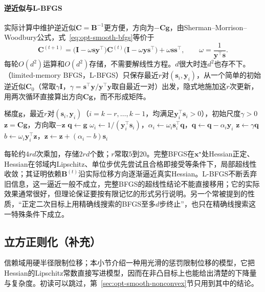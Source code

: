 \paragraph{逆近似与L-BFGS}
实际计算中维护逆近似$\bm C=\bm B^{-1}$更方便，方向为$-\bm C\bm g$，由Sherman--Morrison--Woodbury公式，式~\eqref{eq:opt-smooth-bfgs}等价于
\[
  \bm C^{(t+1)}=\bigl(\bm I-\omega\bm s\bm y^\top\bigr)\bm C^{(t)}\bigl(\bm I-\omega\bm y\bm s^\top\bigr)+\omega\bm s\bm s^\top,\qquad\omega=\frac1{\bm y^\top\bm s}.
\]
每轮$O(d^2)$运算和$O(d^2)$存储，不需要解线性方程。$d$很大时连$d^2$也存不下。（limited-memory BFGS，L-BFGS）只保存最近$r$对$(\bm s_i,\bm y_i)$，从一个简单的初始逆近似$\bm C_0$（常取$\gamma\bm I$，$\gamma=\bm s^\top\bm y/\bm y^\top\bm y$取自最近一对）出发，隐式地施加这$r$次更新，用两次循环直接算出方向$\bm C\bm g$，而不形成矩阵。

\begin{algorithm}[L-BFGS的双循环递推]
\label{alg:opt-smooth-lbfgs}
\begin{algorithmic}[1]
\Require 梯度$\bm g$，最近$r$对$(\bm s_i,\bm y_i)$（$i=k-r,\dots,k-1$，均满足$\bm y_i^\top\bm s_i>0$），初始尺度$\gamma>0$
\Ensure $\bm z=\bm C\bm g$，方向取$-\bm z$
\State $\bm q\gets\bm g$
 
  \State $\omega_i\gets1/(\bm y_i^\top\bm s_i)$，$\alpha_i\gets\omega_i\bm s_i^\top\bm q$，$\bm q\gets\bm q-\alpha_i\bm y_i$
\EndFor
\State $\bm z\gets\gamma\bm q$
 
  \State $b\gets\omega_i\bm y_i^\top\bm z$，$\bm z\gets\bm z+(\alpha_i-b)\bm s_i$
\EndFor
\end{algorithmic}
\end{algorithm}

每轮约$4rd$次乘加，存储$2rd$个数；$r$常取$5$到$20$。完整BFGS在$\bm x^\star$处Hessian正定、Hessian在邻域内Lipschitz、单位步优先尝试且合格即接受等条件下，局部超线性收敛；其证明依赖$\bm B^{(t)}$沿实际位移方向逐渐逼近真实Hessian\cite{math-nocedal2006numerical}。L-BFGS不断丢弃旧信息，这一逼近一般不成立，完整BFGS的超线性结论不能直接移用；它的实际效果通常很好，但理论保证要按有限记忆的形式另行说明。另一个常被提到的性质，“正定二次目标上用精确线搜索的BFGS至多$d$步终止”，也只在精确线搜索这一特殊条件下成立。

\subsection{立方正则化（补充）}
\label{sec:opt-smooth-cubic}

信赖域用硬半径限制位移；本小节介绍一种用光滑的惩罚限制位移的模型，它把Hessian的Lipschitz常数直接写进模型，因而在非凸目标上也能给出清楚的下降量与复杂度。初读可以跳过，第~\ref{sec:opt-smooth-nonconvex}节只用到其中的结论。

